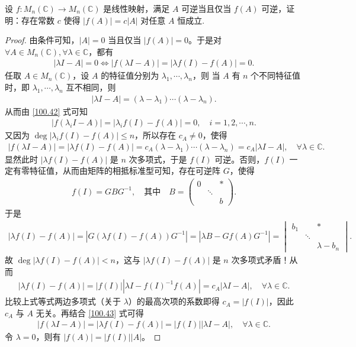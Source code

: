 \documentclass[../../main.tex]{subfiles}
\begin{document}
\begin{example}
设 $f: M_n(\mathbb{C}) \to M_n(\mathbb{C})$ 是线性映射，满足 $A$ 可逆当且仅当 $f(A)$ 可逆，证明：存在常数 $c$ 使得 $|f(A)| = c|A|$ 对任意 $A$ 恒成立. 
\end{example}
\begin{proof}
由条件可知，$|A| = 0$ 当且仅当 $|f(A)| = 0$。于是对 $\forall A \in M_n(\mathbb{C}), \forall \lambda \in \mathbb{C}$，都有
\begin{align}
|\lambda I - A| = 0 \Longleftrightarrow |f(\lambda I - A)| = |\lambda f(I) - f(A)| = 0. \label{100.42}
\end{align}
任取 $A \in M_n(\mathbb{C})$，设 $A$ 的特征值分别为 $\lambda_1, \cdots, \lambda_n$，则
当 $A$ 有 $n$ 个不同特征值时，即 $\lambda_1, \cdots, \lambda_n$ 互不相同，则
\begin{align*}
|\lambda I - A| = (\lambda - \lambda_1) \cdots (\lambda - \lambda_n).
\end{align*}
从而由 \eqref{100.42} 式可知
\begin{align*}
|f(\lambda_i I - A)| = |\lambda_i f(I) - f(A)| = 0, \quad i = 1, 2, \cdots, n.
\end{align*}
又因为 $\deg |\lambda_i f(I) - f(A)| \leqslant n$，所以存在 $c_A \ne 0$，使得
\begin{align}
|f(\lambda I - A)| = |\lambda f(I) - f(A)| = c_A (\lambda - \lambda_1) \cdots (\lambda - \lambda_n) = c_A |\lambda I - A|, \quad \forall \lambda \in \mathbb{C}. \label{100.43}
\end{align}
显然此时 $|\lambda f(I) - f(A)|$ 是 $n$ 次多项式，于是 $f(I)$ 可逆。否则，$f(I)$ 一定有零特征值，从而由矩阵的相抵标准型可知，存在可逆阵 $G$，使得
\begin{align*}
f(I) = G B G^{-1}, \quad \text{其中} \quad B = \begin{pmatrix}
0 & & * \\
& \ddots & \\
& & b
\end{pmatrix}.
\end{align*}
于是
\begin{align*}
|\lambda f(I) - f(A)| = |G (\lambda f(I) - f(A)) G^{-1}| = |\lambda B - G f(A) G^{-1}| = \begin{vmatrix}
b_1 & & * \\
& \ddots & \\
& & \lambda - b_n
\end{vmatrix}.
\end{align*}
故 $\deg |\lambda f(I) - f(A)| < n$，这与 $|\lambda f(I) - f(A)|$ 是 $n$ 次多项式矛盾！从而
\begin{align*}
|\lambda f(I) - f(A)| = |f(I)| |\lambda I - f(I)^{-1} f(A)| = c_A |\lambda I - A|, \quad \forall \lambda \in \mathbb{C}.
\end{align*}
比较上式等式两边多项式（关于 $\lambda$）的最高次项的系数即得 $c_A = |f(I)|$，因此 $c_A$ 与 $A$ 无关。再结合 \eqref{100.43} 式可得
\begin{align*}
|f(\lambda I - A)| = |\lambda f(I) - f(A)| = |f(I)| |\lambda I - A|, \quad \forall \lambda \in \mathbb{C}.
\end{align*}
令 $\lambda = 0$，则有 $|f(A)| = |f(I)| |A|$。


\end{proof}
\end{document}
